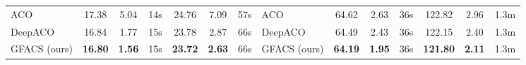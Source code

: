 \begin{tabular}{lcccccclcccccc}
\cmidrule(lr{0.1em}){12-14}
ACO & 17.38 & 5.04 & 14s & 24.76 & 7.09 & 57s &
ACO & 64.62 & 2.63 & 36s & 122.82 & 2.96 & 1.3m 
\\
DeepACO & 16.84 & 1.77 & 15s & 23.78 & 2.87 & 66s &
DeepACO & 64.49 & 2.43 & 36s & 122.15 & 2.40 & 1.3m
\\ 
GFACS (ours) & \textbf{16.80} & \textbf{1.56} & 15s & \textbf{23.72} & \textbf{2.63} & 66s &
GFACS (ours) & \textbf{64.19} & \textbf{1.95} & 36s & \textbf{121.80} & \textbf{2.11} & 1.3m
\\
\cmidrule[1.0pt](lr{0.1em}){1-7}
\cmidrule[1.0pt](lr{0.1em}){8-14}
\end{tabular}

